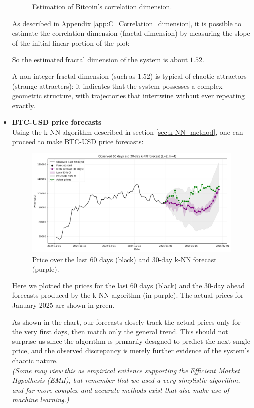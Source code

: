 \begin{itemize}
\begin{figure}[H]
\begin{subfigure}[t]{0.49\textwidth}
            \label{fig:correlation_dimension}
        \end{subfigure}
        \caption{Estimation of Bitcoin’s correlation dimension.}
        \label{fig:dimension_estimation}
    \end{figure}
    
    As described in Appendix \ref{app:C_Correlation_dimension}, it is possible to estimate the correlation dimension (fractal dimension) by measuring the slope of the initial linear portion of the plot:
    
    So the estimated fractal dimension of the system is about $1.52$.
    
    A non-integer fractal dimension (such as $1.52$) is typical of chaotic attractors (strange attractors): it indicates that the system possesses a complex geometric structure, with trajectories that intertwine without ever repeating exactly.
    
    \item \textbf{BTC-USD price forecasts}\\
    Using the k-NN algorithm described in section \ref{sec:k-NN_method}, one can proceed to make BTC-USD price forecasts:
    \begin{figure} [H]
        \centering
        \includegraphics[width=1\linewidth]{img/forecast.png}
        \caption{Price over the last 60 days (black) and 30-day k-NN forecast (purple).}
    \end{figure}
    Here we plotted the prices for the last 60 days (black) and the 30-day ahead forecasts produced by the k-NN algorithm (in purple). The actual prices for January 2025 are shown in green.
    
    As shown in the chart, our forecasts closely track the actual prices only for the very first days, then match only the general trend. This should not surprise us since the algorithm is primarily designed to predict the next single price, and the observed discrepancy is merely further evidence of the system’s chaotic nature.\\
    \textit{(Some may view this as empirical evidence supporting the Efficient Market Hypothesis (EMH), but remember that we used a very simplistic algorithm, and far more complex and accurate methods exist that also make use of machine learning.)}
\end{itemize}